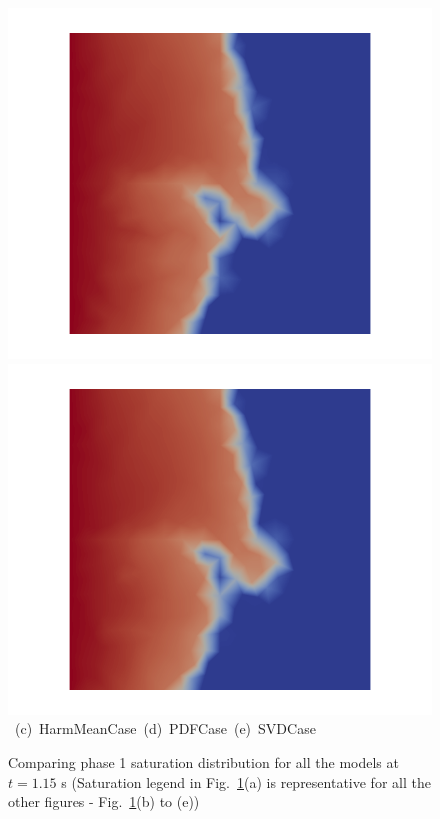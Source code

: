 \begin{landscape}
\begin{figure}[ht]
{{      \includegraphics[width=.56\textwidth]{./Pics/PDFCase/PDFCase_Saturation_t_1dot15.png} 
      \includegraphics[width=.56\textwidth]{./Pics/SVDCase/SVDCase_Saturation_t_1dot15.png}}
\vspace{0.cm}
\hbox{ \hspace{1.75cm} (c) HarmMeanCase \hspace{5.0cm} (d) PDFCase \hspace{5.0cm} (e) SVDCase}
\vspace{0.cm}
}   
\caption{Comparing phase 1 saturation distribution for all the models at $t=1.15$ s (Saturation legend in Fig.~\ref{fig:Saturationfield@t=1.15s}(a) is representative for all the other figures - \ie Fig.~\ref{fig:Saturationfield@t=1.15s}(b) to (e))}
\label{fig:Saturationfield@t=1.15s}
\end{figure}
\end{landscape}
\clearpage



